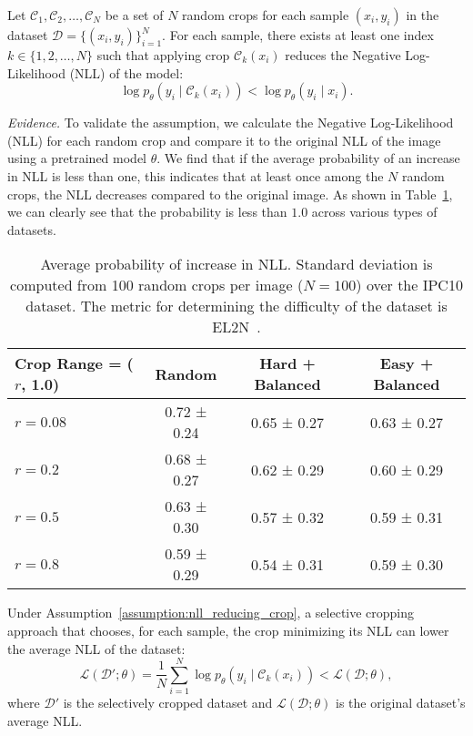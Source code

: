 \begin{assumption}
\label{assumption:nll_reducing_crop}
Let \( \mathcal{C}_1, \mathcal{C}_2, \ldots, \mathcal{C}_N \) be a set of \( N \) random crops for each sample \( (x_i, y_i) \) in the dataset \( \mathcal{D} = \{(x_i, y_i)\}_{i=1}^N \). For each sample, there exists at least one index \( k \in \{1, 2, \ldots, N\} \) such that applying crop \( \mathcal{C}_k(x_i) \) reduces the Negative Log-Likelihood (NLL) of the model:
\[
\log p_\theta(y_i \mid \mathcal{C}_k(x_i)) < \log p_\theta(y_i \mid x_i).
\]
\end{assumption}

\textit{Evidence.} To validate the assumption, we calculate the Negative Log-Likelihood (NLL) for each random crop and compare it to the original NLL of the image using a pretrained model \(\theta\). We find that if the average probability of an increase in NLL is less than one, this indicates that at least once among the \(N\) random crops, the NLL decreases compared to the original image. As shown in Table~\ref{tab:nll-change}, we can clearly see that the probability is less than $1.0$ across various types of datasets.

\begin{table}[H]
\centering
\caption{Average probability of increase in NLL. Standard deviation is computed from 100 random crops per image ($N=100$) over the IPC10 dataset. The metric for determining the difficulty of the dataset is EL2N~\cite{paul2021deep}.}
\label{tab:nll-change}
\begin{tabular}{@{}lccc@{}}
\toprule
\textbf{Crop Range = ($r$, 1.0)} & \textbf{Random} & \textbf{Hard + Balanced} & \textbf{Easy + Balanced} \\ \midrule
$r=0.08$ & 0.72 ± 0.24 & 0.65 ± 0.27 & 0.63 ± 0.27 \\
$r=0.2$  & 0.68 ± 0.27 & 0.62 ± 0.29 & 0.60 ± 0.29 \\
$r=0.5$  & 0.63 ± 0.30 & 0.57 ± 0.32 & 0.59 ± 0.31 \\
$r=0.8$  & 0.59 ± 0.29 & 0.54 ± 0.31 & 0.59 ± 0.30 \\ \bottomrule
\end{tabular}
\end{table}


\begin{lemma}
\label{lemma:selective_cropping_nll}
Under Assumption~\ref{assumption:nll_reducing_crop}, a selective cropping approach that chooses, for each sample, the crop minimizing its NLL can lower the average NLL of the dataset:
\[
\mathcal{L}(\mathcal{D}'; \theta) = \frac{1}{N} \sum_{i=1}^N \log p_\theta(y_i \mid \mathcal{C}_k(x_i)) < \mathcal{L}(\mathcal{D}; \theta),
\]
where \( \mathcal{D}' \) is the selectively cropped dataset and \( \mathcal{L}(\mathcal{D}; \theta) \) is the original dataset's average NLL.
\end{lemma}

